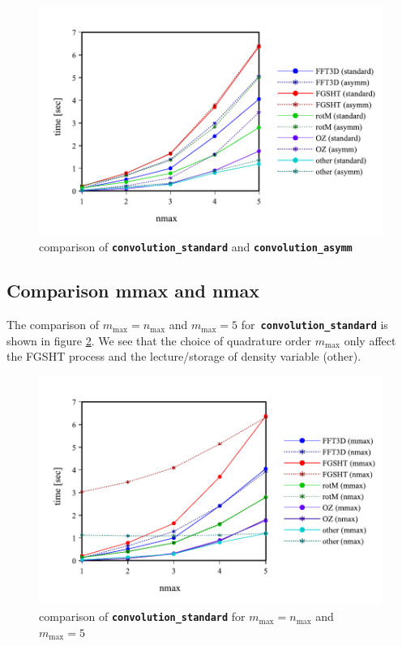 \begin{figure}[H]
\begin{centering}
\includegraphics[bb=0bp 20bp 432bp 268bp,scale=0.6]{_figure/results/asymm}
\par\end{centering}
\caption{comparison of \texttt{\textbf{convolution\_standard}} and \texttt{\textbf{convolution\_asymm\label{fig:comparison-asymm}}}}
\end{figure}


\subsection{Comparison mmax and nmax}

The comparison of $m_{\max}=n_{\max}$ and $m_{\max}=5$ for\texttt{\textbf{
convolution\_standard}} is shown in figure \ref{fig:comparison-nmax}.
We see that the choice of quadrature order $m_{\max}$ only affect
the FGSHT process and the lecture/storage of density variable (other).

\begin{figure}[H]
\begin{centering}
\includegraphics[bb=0bp 20bp 432bp 268bp,scale=0.6]{_figure/results/nmax}
\par\end{centering}
\caption{comparison of \texttt{\textbf{convolution\_standard}} for $m_{\max}=n_{\max}$
and $m_{\max}=5$\label{fig:comparison-nmax}}
\end{figure}


